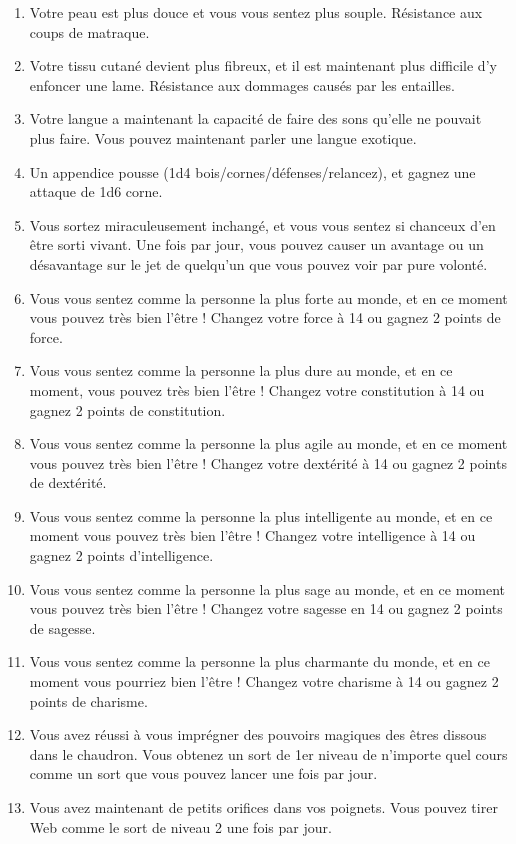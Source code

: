 \documentclass{article}
\begin{document}
\begin{enumerate}
	\item Votre peau est plus douce et vous vous sentez plus souple. Résistance aux coups de matraque.
	\item Votre tissu cutané devient plus fibreux, et il est maintenant plus difficile d'y enfoncer une lame. Résistance aux dommages causés par les entailles.
	\item Votre langue a maintenant la capacité de faire des sons qu'elle ne pouvait plus faire. Vous pouvez maintenant parler une langue exotique.
	\item Un appendice pousse (1d4 bois/cornes/défenses/relancez), et gagnez une attaque de 1d6 corne.
	\item Vous sortez miraculeusement inchangé, et vous vous sentez si chanceux d'en être sorti vivant. Une fois par jour, vous pouvez causer un avantage ou un désavantage sur le jet de quelqu'un que vous pouvez voir par pure volonté.
	\item Vous vous sentez comme la personne la plus forte au monde, et en ce moment vous pouvez très bien l'être ! Changez votre force à 14 ou gagnez 2 points de force.
	\item Vous vous sentez comme la personne la plus dure au monde, et en ce moment, vous pouvez très bien l'être ! Changez votre constitution à 14 ou gagnez 2 points de constitution.
	\item Vous vous sentez comme la personne la plus agile au monde, et en ce moment vous pouvez très bien l'être ! Changez votre dextérité à 14 ou gagnez 2 points de dextérité.
	\item Vous vous sentez comme la personne la plus intelligente au monde, et en ce moment vous pouvez très bien l'être ! Changez votre intelligence à 14 ou gagnez 2 points d’intelligence.
	\item Vous vous sentez comme la personne la plus sage au monde, et en ce moment vous pouvez très bien l'être ! Changez votre sagesse en 14 ou gagnez 2 points de sagesse.
	\item Vous vous sentez comme la personne la plus charmante du monde, et en ce moment vous pourriez bien l'être ! Changez votre charisme à 14 ou gagnez 2 points de charisme.
	\item Vous avez réussi à vous imprégner des pouvoirs magiques des êtres dissous dans le chaudron. Vous obtenez un sort de 1er niveau de n'importe quel cours comme un sort que vous pouvez lancer une fois par jour.
	\item Vous avez maintenant de petits orifices dans vos poignets. Vous pouvez tirer Web comme le sort de niveau 2 une fois par jour.

\end{enumerate}
\end{document}
